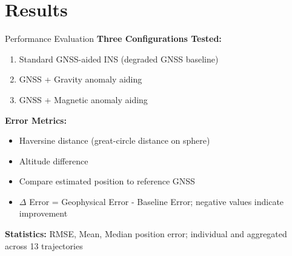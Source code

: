 \documentclass[aspectratio=169]{beamer}
\begin{document}
\section{Results}

\begin{frame}{Performance Evaluation}
\textbf{Three Configurations Tested:}
\begin{enumerate}
    \item Standard GNSS-aided INS (degraded GNSS baseline)
    \item GNSS + Gravity anomaly aiding
    \item GNSS + Magnetic anomaly aiding
\end{enumerate} \pause
\textbf{Error Metrics:}
\begin{itemize}
    \item Haversine distance (great-circle distance on sphere)
    \item Altitude difference
    \item Compare estimated position to reference GNSS
    \item $\Delta$ Error = Geophysical Error - Baseline Error; negative values indicate improvement
\end{itemize} \pause
\textbf{Statistics:} RMSE, Mean, Median position error; individual and aggregated across 13 trajectories
\end{frame}
\end{document}
